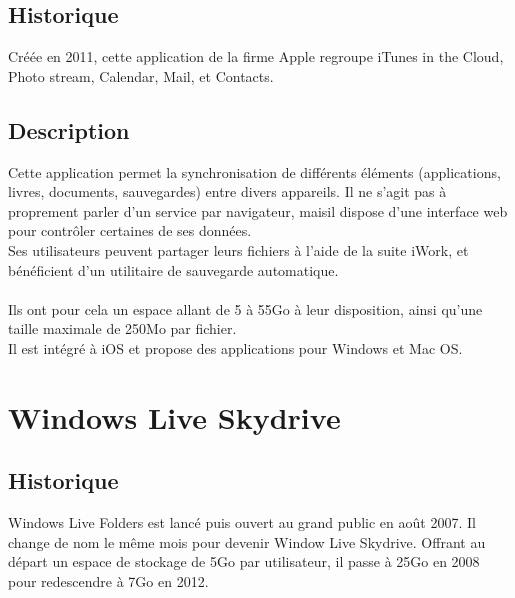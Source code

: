 \subsection{Historique}
Créée en 2011, cette application de la firme Apple regroupe iTunes in the Cloud, Photo stream, Calendar, Mail, et Contacts.

\subsection{Description}
Cette application permet la synchronisation de différents éléments (applications, livres, documents, sauvegardes) entre divers appareils. Il ne s'agit pas à proprement parler d'un service par navigateur, maisil dispose d'une interface web pour contrôler certaines de ses données.\\
Ses utilisateurs peuvent partager leurs fichiers à l'aide de la suite iWork, et bénéficient d'un utilitaire de sauvegarde automatique.\\
\\
Ils ont pour cela un espace allant de 5 à 55Go à leur disposition, ainsi qu'une taille maximale de 250Mo par fichier.\\
Il est intégré à iOS et propose des applications pour Windows et Mac OS.\\


\section{Windows Live Skydrive}

\subsection{Historique}
Windows Live Folders est lancé puis ouvert au grand public en août 2007. Il change de nom le même mois pour devenir Window Live Skydrive. Offrant au départ un espace de stockage de 5Go par utilisateur, il passe à 25Go en 2008 pour redescendre à 7Go en 2012.\\

